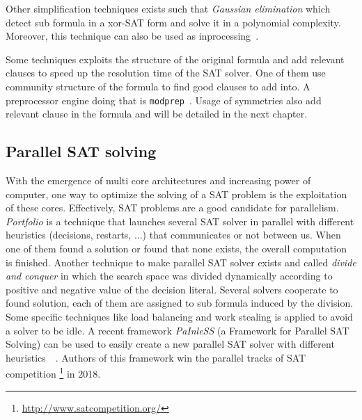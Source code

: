 Other simplification techniques exists such that \emph{Gaussian elimination} which detect sub formula in a xor-SAT
form and solve it in a polynomial complexity. Moreover, this technique can also be used as inprocessing~\cite{soos2010enhanced}. 

Some techniques exploits the structure of the original formula and add relevant clauses to speed up the resolution
time of the SAT solver. One of them use community structure of the formula to find good clauses to add into.
A preprocessor engine doing that is  \texttt{modprep}~\cite{ansotegui2015using}.
Usage of symmetries also add relevant clause in the formula and will be detailed in the next chapter.


\subsection{Parallel SAT solving}
With the emergence of multi core architectures and increasing power of computer, one way to optimize the solving
of a SAT problem is the exploitation of these cores. Effectively, SAT problems are a good candidate for parallelism.
\emph{Portfolio} is a technique that launches several SAT solver in parallel with different heuristics (decisions, restarts, ...) that communicates or not between us. When one of them found a solution or found that none exists, the overall computation is finished. Another technique to make parallel SAT solver exists and called \emph{divide and conquer} in which the search space was divided dynamically according to positive and negative value of the decision
literal. Several solvers cooperate to found solution, each of them are assigned to sub formula induced by the division. Some specific techniques like load balancing and work stealing is applied to avoid a solver to be idle.
A recent framework \emph{PaInleSS} (a Framework for Parallel SAT Solving) can be used to easily create a new parallel 
SAT solver with different heuristics~\cite{le2017painless}~\cite{le2019modular}. Authors of this framework win the parallel tracks of SAT competition \footnote{\url{http://www.satcompetition.org/}} in 2018.






%

